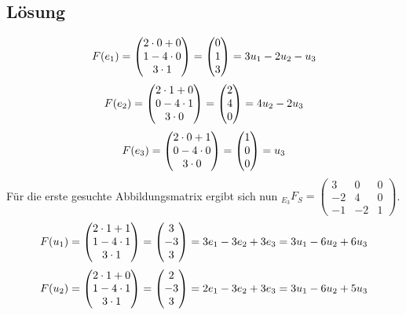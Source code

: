 \documentclass[german,12pt]{homework}
\DeclarePairedDelimiter{\enbrace}{(}{)}
\begin{document}
    \subsection*{Lösung}
    \[F\enbrace*{e_1} = \begin{pmatrix}
        2 \cdot 0 + 0\\
        1 - 4 \cdot 0\\
        3 \cdot 1
    \end{pmatrix} = \begin{pmatrix}0\\1\\3\end{pmatrix} = 3u_1 - 2u_2 - u_3\]
    \[F\enbrace*{e_2} = \begin{pmatrix}
        2 \cdot 1 + 0\\
        0 - 4 \cdot 1\\
        3 \cdot 0
    \end{pmatrix} = \begin{pmatrix}2\\4\\0\end{pmatrix} = 4u_2 - 2u_3\]
    \[F\enbrace*{e_3} = \begin{pmatrix}
        2 \cdot 0 + 1\\
        0 - 4 \cdot 0\\
        3 \cdot 0
    \end{pmatrix} = \begin{pmatrix}1\\0\\0\end{pmatrix} = u_3\]
    Für die erste gesuchte Abbildungsmatrix ergibt sich nun
    \(_{E_3}F_S = \begin{pmatrix}
        3 & 0 & 0\\
        -2 & 4 & 0\\
        -1 & -2 & 1
    \end{pmatrix}\).
    \[F\enbrace*{u_1} = \begin{pmatrix}
        2 \cdot 1 + 1\\
        1 - 4 \cdot 1\\
        3 \cdot 1
    \end{pmatrix} = \begin{pmatrix}3\\-3\\3\end{pmatrix} = 3e_1 - 3e_2 + 3e_3 = 3u_1 - 6u_2 + 6u_3\]
    \[F\enbrace*{u_2} = \begin{pmatrix}
        2 \cdot 1 + 0\\
        1 - 4 \cdot 1\\
        3 \cdot 1
    \end{pmatrix} = \begin{pmatrix}2\\-3\\3\end{pmatrix} = 2e_1 - 3e_2 + 3e_3 = 3u_1 - 6u_2 + 5u_3\]
\end{document}

